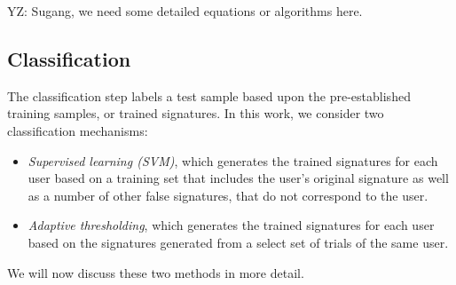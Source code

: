 YZ: Sugang, we need some detailed equations or algorithms here.
\fi

\subsection{Classification}
The classification step labels a test sample based upon the pre-established training samples, or trained signatures.
%
In this work, we consider two classification mechanisms:
\begin{itemize}
\item {\em Supervised learning (SVM)}, which generates the trained signatures
for each user based on a training set that includes the user's original
signature as well as a number of other false signatures, that do not
correspond to the user.
\item {\em Adaptive thresholding}, which generates the trained signatures for
each user based on the signatures generated from a select set of trials of the
same user.

\end{itemize}

We will now discuss these two methods in more detail.

